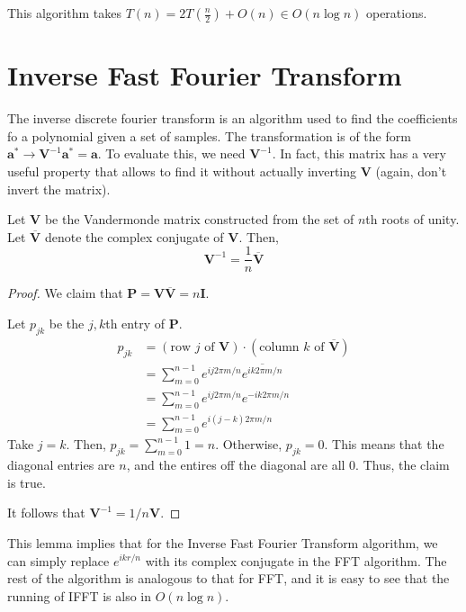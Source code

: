 This algorithm takes $T(n) = 2T\left( \frac{n}{2} \right) + O(n) \in O(n \log n)$ operations.

\section{Inverse Fast Fourier Transform} 

The inverse discrete fourier transform is an algorithm used to find the coefficients fo a polynomial given a set of samples. The transformation is of the form $\mathbf{a}^* \to \mathbf{V}^{-1}\mathbf{a}^* = \mathbf{a}$. To evaluate this, we need $\mathbf{V}^{-1}$. In fact, this matrix has a very useful property that allows to find it without actually inverting $\mathbf{V}$ (again, don't invert the matrix).

\begin{lemma}
    Let $\mathbf{V}$ be the Vandermonde matrix constructed from the set of $n$th roots of unity. Let $\overline{\mathbf{V}}$ denote the complex conjugate of $\mathbf{V}$. Then,
    $$
    \mathbf{V}^{-1} = \frac{1}{n}\overline{\mathbf{V}}
    $$
\end{lemma}

\begin{proof}
    We claim that $\mathbf{P} = \mathbf{V}\overline{\mathbf{V}} = n \mathbf{I}$.

    Let $p_{jk}$ be the $j,k$th entry of $\mathbf{P}$.
    $$
    \begin{aligned}
        p_{jk} &= (\text{row $j$ of $\mathbf{V}$}) \cdot (\text{column $k$ of $\overline{\mathbf{V}}$}) \\
        &= \sum_{m=0}^{n-1} e^{ij2\pi m/n} \overline{e^{ik2\pi m/n}} \\
        &= \sum_{m=0}^{n-1} e^{ij2\pi m/n} e^{-ik2\pi m/n} \\
        &= \sum_{m=0}^{n-1} e^{i(j-k)2\pi m/n}
    \end{aligned}
    $$
    Take $j=k$. Then, $p_{jk} = \sum_{m=0}^{n-1} 1 = n$. Otherwise, $p_{jk} = 0$. This means that the diagonal entries are $n$, and the entires off the diagonal are all 0. Thus, the claim is true.

    It follows that $\mathbf{V}^{-1} = 1/n \mathbf{V}$.
\end{proof}

This lemma implies that for the Inverse Fast Fourier Transform algorithm, we can simply replace $e^{ikr/n}$ with its complex conjugate in the FFT algorithm. The rest of the algorithm is analogous to that for FFT, and it is easy to see that the running of IFFT is also in $O(n \log n)$.

